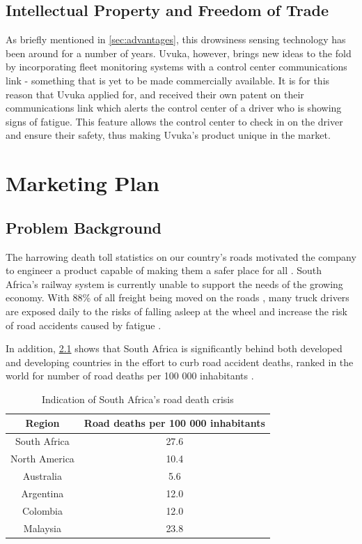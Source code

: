 \section{Intellectual Property and Freedom of Trade}
As briefly mentioned in \cref{sec:advantages}, this drowsiness sensing technology has been around for a number of years. Uvuka, however, brings new ideas to the fold by incorporating fleet monitoring systems with a control center communications link - something that is yet to be made commercially available. It is for this reason that Uvuka applied for, and received their own patent on their communications link which alerts the control center of a driver who is showing signs of fatigue. This feature allows the control center to check in on the driver and ensure their safety, thus making Uvuka's product unique in the market.

\newpage
\chapter{Marketing Plan}
\section{Problem Background}
The harrowing death toll statistics on our country's roads motivated the company to engineer a product capable of making them a safer place for all \cite{EWNRoadDeaths}. South Africa's railway system is currently unable to support the needs of the growing economy. With 88\% of all freight being moved on the roads \cite{BDlive_freight}, many truck drivers are exposed daily to the risks of falling asleep at the wheel \cite{ArriveAliveDriverTiredness} and increase the risk of road accidents caused by fatigue \cite{News24TruckersSleeping}.

In addition, \cref{tab:deaths100thousand} shows that South Africa is significantly behind both developed and developing countries in the effort to curb road accident deaths, ranked  in the world for number of road deaths per 100 000 inhabitants \cite{deathsPer100thousandStats}.

\begin{table}[htbp]
  \centering
  \caption{Indication of South Africa's road death crisis}
    \begin{tabular}{cc}
    \toprule
    \textbf{Region} & \textbf{Road deaths per 100 000 inhabitants} \\
    \midrule
    South Africa & 27.6 \\
    North America & 10.4 \\
    Australia & 5.6 \\
    Argentina & 12.0 \\
    Colombia & 12.0 \\
    Malaysia & 23.8 \\
    \bottomrule
    \end{tabular}%
  \label{tab:deaths100thousand}%
\end{table}%

